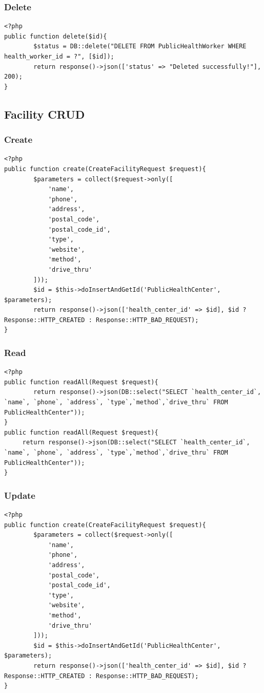 \subsubsection{Delete}
\begin{verbatim}
<?php
public function delete($id){
        $status = DB::delete("DELETE FROM PublicHealthWorker WHERE health_worker_id = ?", [$id]);
        return response()->json(['status' => "Deleted successfully!"], 200);
}

\end{verbatim}
\subsection{Facility CRUD}
\subsubsection{Create}
\begin{verbatim}
<?php
public function create(CreateFacilityRequest $request){
        $parameters = collect($request->only([
            'name',
            'phone',
            'address',
            'postal_code',
            'postal_code_id',
            'type',
            'website',
            'method',
            'drive_thru'
        ]));
        $id = $this->doInsertAndGetId('PublicHealthCenter', $parameters);
        return response()->json(['health_center_id' => $id], $id ? Response::HTTP_CREATED : Response::HTTP_BAD_REQUEST);
}
\end{verbatim}
\subsubsection{Read}
\begin{verbatim}
<?php
public function readAll(Request $request){
        return response()->json(DB::select("SELECT `health_center_id`, `name`, `phone`, `address`, `type`,`method`,`drive_thru` FROM PublicHealthCenter"));
}
public function readAll(Request $request){
     return response()->json(DB::select("SELECT `health_center_id`, `name`, `phone`, `address`, `type`,`method`,`drive_thru` FROM PublicHealthCenter"));
}
\end{verbatim}
\subsubsection{Update}
\begin{verbatim}
<?php
public function create(CreateFacilityRequest $request){
        $parameters = collect($request->only([
            'name',
            'phone',
            'address',
            'postal_code',
            'postal_code_id',
            'type',
            'website',
            'method',
            'drive_thru'
        ]));
        $id = $this->doInsertAndGetId('PublicHealthCenter', $parameters);
        return response()->json(['health_center_id' => $id], $id ? Response::HTTP_CREATED : Response::HTTP_BAD_REQUEST);
}
\end{verbatim}
